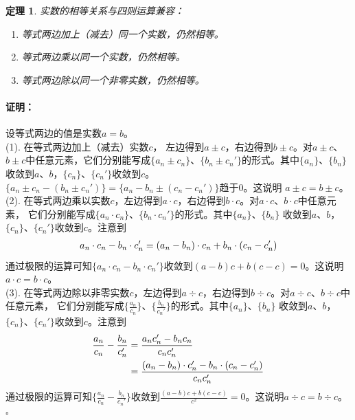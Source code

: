 \documentclass[12pt,UTF8]{ctexbook}
\newtheorem{tm}{定理}[section]
\newenvironment{proof2}{\paragraph{\textbf{证明：}}}{\hfill$\square$}
\begin{document}
\begin{appendix}
\begin{tm}\label{tm:a-1-25}
    实数的相等关系与四则运算兼容：
    \begin{enumerate}
        \item 等式两边加上（减去）同一个实数，仍然相等。
        \item 等式两边乘以同一个实数，仍然相等。
        \item 等式两边除以同一个非零实数，仍然相等。
    \end{enumerate}
\end{tm}
\begin{proof2}
    设等式两边的值是实数$a=b$。\\
    (1). 在等式两边加上（减去）实数$c$，
    左边得到$a\pm c$，右边得到$b\pm c$。对$a\pm c$、$b\pm c$中任意元素，它们分别能写成$\{a_n\pm c_n\}$、$\{b_n\pm c_n'\}$的形式。其中$\{a_n\}$、$\{b_n\}$
    收敛到$a$、$b$，$\{c_n\}$、$\{c_n'\}$收敛到$c$。$\{a_n\pm c_n-(b_n\pm c_n')\} = \{a_n - b_n \pm  (c_n - c_n')\}$趋于$0$。这说明
    $a\pm c = b\pm c$。\\
    (2). 在等式两边乘以实数$c$，左边得到$a\cdot c$，右边得到$b\cdot c$。对$a\cdot c$、$b\cdot c$中任意元素，
    它们分别能写成$\{a_n\cdot c_n\}$、$\{b_n\cdot c_n'\}$的形式。其中$\{a_n\}$、$\{b_n\}$
    收敛到$a$、$b$，$\{c_n\}$、$\{c_n'\}$收敛到$c$。注意到
    \begin{align}
        a_n\cdot c_n - b_n\cdot c_n' &= (a_n - b_n)\cdot c_n + b_n\cdot(c_n - c_n') \notag \\
    \end{align}
    通过极限的运算可知$\{a_n\cdot c_n - b_n\cdot c_n'\}$收敛到$(a - b)c + b(c - c) = 0$。这说明$a\cdot c = b\cdot c$。\\
    (3). 在等式两边除以非零实数$c$，左边得到$a\div c$，右边得到$b\div c$。对$a\div c$、$b\div c$中任意元素，
    它们分别能写成$\{\frac{a_n}{c_n}\}$、$\{\frac{b_n}{c_n'}\}$的形式。其中$\{a_n\}$、$\{b_n\}$
    收敛到$a$、$b$，$\{c_n\}$、$\{c_n'\}$收敛到$c$。注意到
    \begin{align}
        \frac{a_n}{c_n} - \frac{b_n}{c_n'} &= \frac{a_nc_n' - b_nc_n}{c_nc_n'} \notag \\
        &= \frac{(a_n - b_n)\cdot c_n' - b_n\cdot(c_n - c_n')}{c_nc_n'}
    \end{align}
    通过极限的运算可知$\{\frac{a_n}{c_n} - \frac{b_n}{c_n'}\}$收敛到$\frac{(a - b)c + b(c - c)}{c^2} = 0$。这说明$a\div c = b\div c$。\\
\end{proof2}


\end{appendix}
\end{document}
